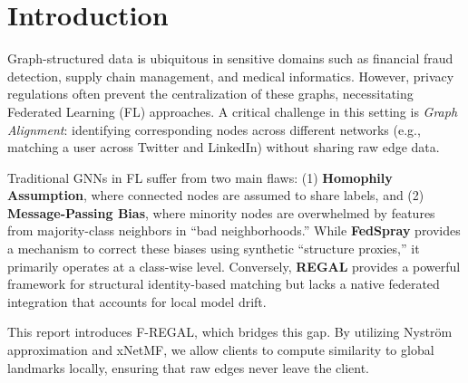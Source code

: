 \section{Introduction}
Graph-structured data is ubiquitous in sensitive domains such as financial fraud detection, supply chain management, and medical informatics. However, privacy regulations often prevent the centralization of these graphs, necessitating Federated Learning (FL) approaches. A critical challenge in this setting is \textit{Graph Alignment}: identifying corresponding nodes across different networks (e.g., matching a user across Twitter and LinkedIn) without sharing raw edge data.

Traditional GNNs in FL suffer from two main flaws: (1) \textbf{Homophily Assumption}, where connected nodes are assumed to share labels, and (2) \textbf{Message-Passing Bias}, where minority nodes are overwhelmed by features from majority-class neighbors in ``bad neighborhoods.'' While \textbf{FedSpray} provides a mechanism to correct these biases using synthetic ``structure proxies,'' it primarily operates at a class-wise level. Conversely, \textbf{REGAL} provides a powerful framework for structural identity-based matching but lacks a native federated integration that accounts for local model drift.

This report introduces F-REGAL, which bridges this gap. By utilizing Nyström approximation and xNetMF, we allow clients to compute similarity to global landmarks locally, ensuring that raw edges never leave the client.